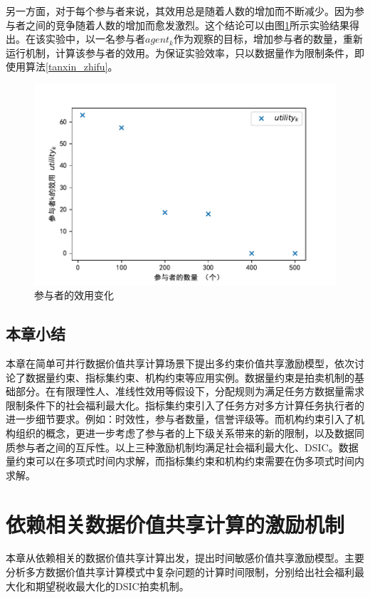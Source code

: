 \documentclass[promaster]{thesis-uestc}
\begin{document}
另一方面，对于每个参与者来说，其效用总是随着人数的增加而不断减少。因为参与者之间的竞争随着人数的增加而愈发激烈。这个结论可以由图\ref{utility}所示实验结果得出。在该实验中，以一名参与者$agent_k$作为观察的目标，增加参与者的数量，重新运行机制，计算该参与者的效用。为保证实验效率，只以数据量作为限制条件，即使用算法\ref{tanxin_zhifu}。

\begin{figure}[H]
\includegraphics[width=350pt]{exp/utility.pdf}
\caption{参与者的效用变化}
\label{utility}
\end{figure}

\FloatBarrier

\section{本章小结}
本章在简单可并行数据价值共享计算场景下提出多约束价值共享激励模型，依次讨论了数据量约束、指标集约束、机构约束等应用实例。数据量约束是拍卖机制的基础部分。在有限理性人、准线性效用等假设下，分配规则为满足任务方数据量需求限制条件下的社会福利最大化。指标集约束引入了任务方对多方计算任务执行者的进一步细节要求。例如：时效性，参与者数量，信誉评级等。而机构约束引入了机构组织的概念，更进一步考虑了参与者的上下级关系带来的新的限制，以及数据同质参与者之间的互斥性。以上三种激励机制均满足社会福利最大化、DSIC。数据量约束可以在多项式时间内求解，而指标集约束和机构约束需要在伪多项式时间内求解。

\chapter{依赖相关数据价值共享计算的激励机制}
本章从依赖相关的数据价值共享计算出发，提出时间敏感价值共享激励模型。主要分析多方数据价值共享计算模式中复杂问题的计算时间限制，分别给出社会福利最大化和期望税收最大化的DSIC拍卖机制。
\end{document}
